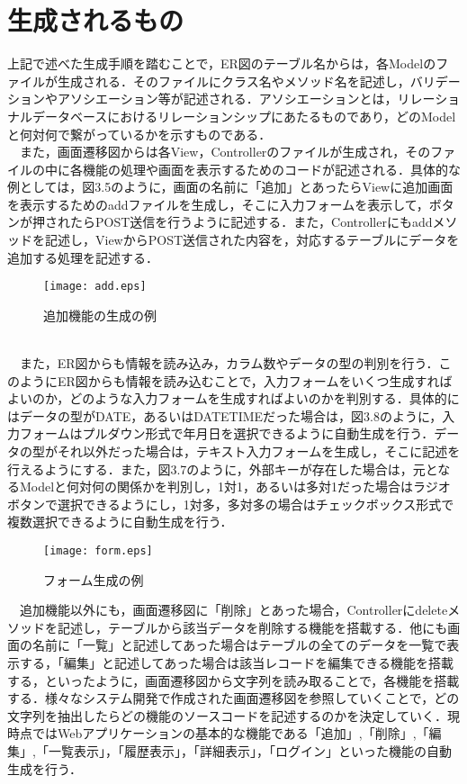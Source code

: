 \documentclass{funthesis}
\begin{document}
\section{生成されるもの}
上記で述べた生成手順を踏むことで，ER図のテーブル名からは，各Modelのファイルが生成される．そのファイルにクラス名やメソッド名を記述し，バリデーションやアソシエーション等が記述される．アソシエーションとは，リレーショナルデータベースにおけるリレーションシップにあたるものであり，どのModelと何対何で繋がっているかを示すものである．\\
　また，画面遷移図からは各View，Controllerのファイルが生成され，そのファイルの中に各機能の処理や画面を表示するためのコードが記述される．具体的な例としては，図3.5のように，画面の名前に「追加」とあったらViewに追加画面を表示するためのaddファイルを生成し，そこに入力フォームを表示して，ボタンが押されたらPOST送信を行うように記述する．また，Controllerにもaddメソッドを記述し，ViewからPOST送信された内容を，対応するテーブルにデータを追加する処理を記述する．
\begin{figure}[h]
\begin{center}
\texttt{[image: add.eps]}
\caption{追加機能の生成の例}
\end{center}
\end{figure}
\\
　また，ER図からも情報を読み込み，カラム数やデータの型の判別を行う．このようにER図からも情報を読み込むことで，入力フォームをいくつ生成すればよいのか，どのような入力フォームを生成すればよいのかを判別する．具体的にはデータの型がDATE，あるいはDATETIMEだった場合は，図3.8のように，入力フォームはプルダウン形式で年月日を選択できるように自動生成を行う．データの型がそれ以外だった場合は，テキスト入力フォームを生成し，そこに記述を行えるようにする．また，図3.7のように，外部キーが存在した場合は，元となるModelと何対何の関係かを判別し，1対1，あるいは多対1だった場合はラジオボタンで選択できるようにし，1対多，多対多の場合はチェックボックス形式で複数選択できるように自動生成を行う．
\begin{figure}[h!]
\begin{center}
\texttt{[image: form.eps]}
\caption{フォーム生成の例}
\end{center}
\end{figure}
　追加機能以外にも，画面遷移図に「削除」とあった場合，Controllerにdeleteメソッドを記述し，テーブルから該当データを削除する機能を搭載する．他にも画面の名前に「一覧」と記述してあった場合はテーブルの全てのデータを一覧で表示する，「編集」と記述してあった場合は該当レコードを編集できる機能を搭載する，といったように，画面遷移図から文字列を読み取ることで，各機能を搭載する．様々なシステム開発で作成された画面遷移図を参照していくことで，どの文字列を抽出したらどの機能のソースコードを記述するのかを決定していく．現時点ではWebアプリケーションの基本的な機能である「追加」,「削除」,「編集」,「一覧表示」，「履歴表示」，「詳細表示」，「ログイン」といった機能の自動生成を行う．\\
\end{document}
